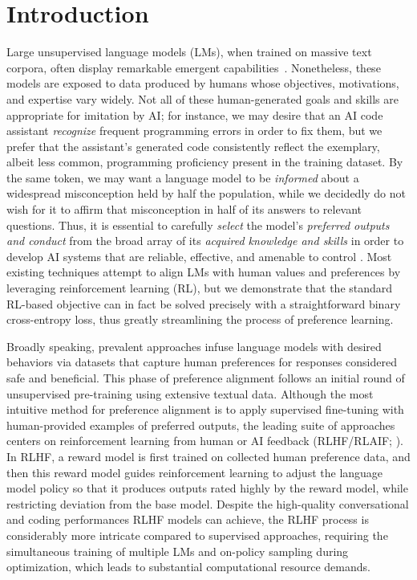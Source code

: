 \section{Introduction}
Large unsupervised language models (LMs), when trained on massive text corpora, often display remarkable emergent capabilities~\citep{chowdhery2022palm, brown2020language, touvron2023llama,bubeck2023sparks}. Nonetheless, these models are exposed to data produced by humans whose objectives, motivations, and expertise vary widely. Not all of these human-generated goals and skills are appropriate for imitation by AI; for instance, we may desire that an AI code assistant \textit{recognize} frequent programming errors in order to fix them, but we prefer that the assistant's generated code consistently reflect the exemplary, albeit less common, programming proficiency present in the training dataset. By the same token, we may want a language model to be \textit{informed} about a widespread misconception held by half the population, while we decidedly do not wish for it to affirm that misconception in half of its answers to relevant questions. Thus, it is essential to carefully \emph{select} the model's \emph{preferred outputs and conduct} from the broad array of its \textit{acquired knowledge and skills} in order to develop AI systems that are reliable, effective, and amenable to control \citep{ouyang2022training}. Most existing techniques attempt to align LMs with human values and preferences by leveraging reinforcement learning (RL), but we demonstrate that the standard RL-based objective can in fact be solved precisely with a straightforward binary cross-entropy loss, thus greatly streamlining the process of preference learning.

Broadly speaking, prevalent approaches infuse language models with desired behaviors via datasets that capture human preferences for responses considered safe and beneficial. This phase of preference alignment follows an initial round of unsupervised pre-training using extensive textual data. Although the most intuitive method for preference alignment is to apply supervised fine-tuning with human-provided examples of preferred outputs, the leading suite of approaches centers on reinforcement learning from human or AI feedback (RLHF/RLAIF; \citep{christiano2017deep,bai2022constitutional}). In RLHF, a reward model is first trained on collected human preference data, and then this reward model guides reinforcement learning to adjust the language model policy so that it produces outputs rated highly by the reward model, while restricting deviation from the base model. Despite the high-quality conversational and coding performances RLHF models can achieve, the RLHF process is considerably more intricate compared to supervised approaches, requiring the simultaneous training of multiple LMs and on-policy sampling during optimization, which leads to substantial computational resource demands.

